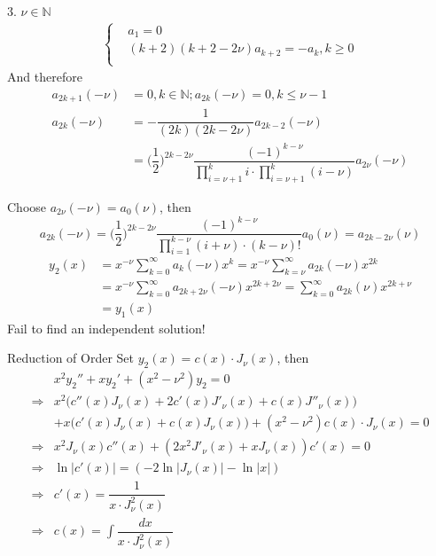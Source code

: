 \documentclass{beamer}
\begin{document}
\begin{frame}
\begin{block}{3. $\nu\in\mathbb{N}$}
\begin{align*}
\left\{
\begin{aligned}
&a_1=0\\
&(k+2)(k+2-2\nu)a_{k+2}=-a_k,k\geqslant0\\
\end{aligned}
\right.
\end{align*}
And therefore
\begin{align*}
a_{2k+1}(-\nu)&=0,k\in\mathbb{N};a_{2k}(-\nu)=0,k\leqslant\nu-1\\
a_{2k}(-\nu)&=-\dfrac{1}{(2k)(2k-2\nu)}a_{2k-2}(-\nu)\\
&=\Big(\dfrac{1}{2}\Big)^{2k-2\nu}\dfrac{(-1)^{k-\nu}}{\prod\limits_{i=\nu+1}^{k}i\cdot\prod\limits_{i=\nu+1}^k(i-\nu)}a_{2\nu}(-\nu)
\end{align*}

\end{block}
\end{frame}

\begin{frame}
\begin{block}{}
Choose $a_{2\nu}(-\nu)=a_0(\nu)$, then
$$a_{2k}(-\nu)=\Big(\dfrac{1}{2}\Big)^{2k-2\nu}\dfrac{(-1)^{k-\nu}}{\prod\limits_{i=1}^{k-\nu}(i+\nu)\cdot(k-\nu)!}a_{0}(\nu)=a_{2k-2\nu}(\nu)$$
\begin{align*}
y_2(x)&=x^{-\nu}\sum\limits_{k=0}^{\infty}a_k(-\nu)x^k=x^{-\nu}\sum\limits_{k=\nu}^{\infty}a_{2k}(-\nu)x^{2k}\\
&=x^{-\nu}\sum\limits_{k=0}^{\infty}a_{2k+2\nu}(-\nu)x^{2k+2\nu}=\sum\limits_{k=0}^{\infty}a_{2k}(\nu)x^{2k+\nu}\\
&=y_1(x)
\end{align*}
Fail to find an independent solution!
\end{block}
\end{frame}

\begin{frame}
\begin{block}{Reduction of Order}
Set $y_2(x)=c(x)\cdot J_{\nu}(x)$, then
\begin{align*}
&x^2y_2''+xy_2'+(x^2-\nu^2)y_2=0\\
\Rightarrow&x^2\big(c''(x) J_{\nu}(x)+2c'(x)J'_{\nu}(x)+c(x)J''_{\nu}(x)\big)\\&+x\big(c'(x)J_{\nu}(x)+c(x)J_{\nu}(x)\big)
+(x^2-\nu^2)c(x)\cdot J_{\nu}(x)=0\\
\Rightarrow &x^2 J_{\nu}(x)c''(x)+(2x^2J'_{\nu}(x)+xJ_{\nu}(x))c'(x)=0\\
\Rightarrow&\ln |c'(x)|=(-2\ln|J_{\nu}(x)|-\ln |x|)\\
\Rightarrow&c'(x)=\dfrac{1}{x\cdot J_{\nu}^2(x)}\\
\Rightarrow&c(x)=\int \dfrac{dx}{x\cdot J_{\nu}^2(x)}
\end{align*}

\end{block}
\end{frame}
\end{document}
